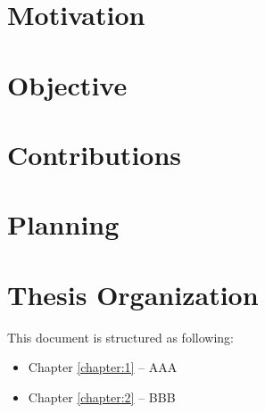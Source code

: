 
\section{Motivation}
\section{Objective}
\section{Contributions}
\section{Planning}
\section{Thesis Organization}

This document is structured as following: 
\begin{itemize}
\item Chapter \ref{chapter:1} – AAA 
\item Chapter \ref{chapter:2} – BBB 
\end{itemize}

